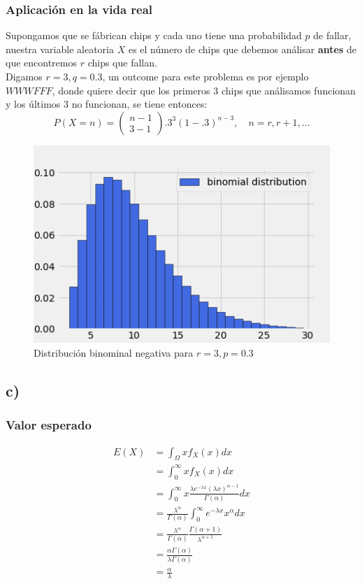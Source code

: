 \documentclass{article}
\begin{document}
\begin{tcolorbox}[breakable]
    \subsubsection*{Aplicación en la vida real}
    Supongamos que se fábrican chips y cada uno tiene una probabilidad $p$ de fallar,
    nuestra variable aleatoria $X$ es el número de chips que debemos análisar \textbf{antes} de que 
    encontremos $r$ chips que fallan. \\
    Digamos $r=3,q=0.3$, un outcome para este problema es por ejemplo $WWWFFF$, donde quiere decir 
    que los primeros 3 chips que análisamos funcionan y los últimos $3$ no funcionan, se tiene entonces:
    \[ P (X = n) =  \left( \begin{matrix} n-1 \\ 3-1 \end{matrix} \right).3^3(1-.3)^{n-3}, \quad n=r,r+1,...\]
    \begin{figure}[H]
        \centering
        \includegraphics[scale=0.7]{images/p7_binomial.png}
        \caption{Distribución binominal negativa para $r=3,p=0.3$}
    \end{figure}
    \subsection*{c)} 
    \subsubsection*{Valor esperado}
    \begin{align*}
        E(X)
        &= \int_\Omega xf_X(x)dx \\
        &= \int_0^\infty xf_X(x)dx \\
        &= \int_0^\infty x\frac{\lambda e^{-\lambda x}(\lambda x)^{\alpha-1}}{\Gamma(\alpha)}dx \\
        &= \frac{\lambda^\alpha}{\Gamma(\alpha)} \int_0^\infty e^{-\lambda x}x^\alpha dx \\
        &= \frac{\lambda^\alpha}{\Gamma(\alpha)} \frac{\Gamma(\alpha+1)}{\lambda^{\alpha+1}} \\
        &= \frac{\alpha \Gamma(\alpha)}{\lambda \Gamma(\alpha)} \\
        &= \frac{\alpha}{\lambda} \\
    \end{align*}

\end{tcolorbox}
\end{document}
